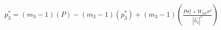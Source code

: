 \documentclass[preview]{standalone}
\begin{document}
\begin{align*}
p_3^\ast = \left(m_3 - 1\right) \left( P \right) - \left(m_3 - 1\right) \left( p_3^\ast\right) + \left(m_3 - 1\right) \left( \frac{P \sigma_\epsilon^2 + W_{tot} \sigma^2}{\left|\hat{h_3}\right|^2}\right)
\end{align*}
\end{document}
